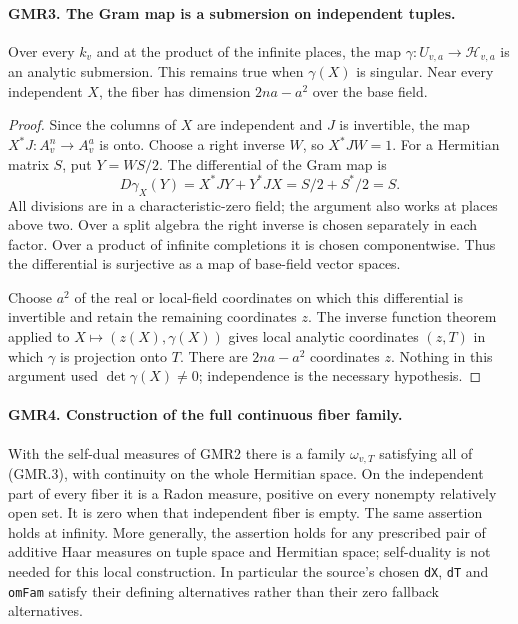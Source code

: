 
\paragraph{GMR3. The Gram map is a submersion on independent tuples.}
\label{claim:GMR3}
Over every $k_v$ and at the product of the infinite places, the map
$\gamma:U_{v,a}\to\mathcal H_{v,a}$ is an analytic submersion.
This remains true when $\gamma(X)$ is singular.  Near every independent
$X$, the fiber has dimension $2na-a^2$ over the base field.

\begin{proof}
Since the columns of $X$ are independent and $J$ is invertible, the
map $X^*J:A_v^n\to A_v^a$ is onto.  Choose a right inverse $W$, so
$X^*JW=1$.  For a Hermitian matrix $S$, put $Y=WS/2$.
The differential of the Gram map is
\[
 D\gamma_X(Y)=X^*JY+Y^*JX=S/2+S^*/2=S.
 \tag{GMR.8}
\]
All divisions are in a characteristic-zero field; the argument also
works at places above two.  Over a split algebra the right inverse
is chosen separately in each factor.  Over a product of infinite
completions it is chosen componentwise.  Thus the differential is
surjective as a map of base-field vector spaces.

Choose $a^2$ of the real or local-field coordinates on which this
differential is invertible and retain the remaining coordinates $z$.
The inverse function theorem applied to $X\mapsto(z(X),\gamma(X))$
gives local analytic coordinates $(z,T)$ in which $\gamma$ is projection
onto $T$.  There are $2na-a^2$ coordinates $z$.
Nothing in this argument used $\det\gamma(X)\ne0$; independence is the
necessary hypothesis.
\end{proof}

\paragraph{GMR4. Construction of the full continuous fiber family.}
\label{claim:GMR4}
With the self-dual measures of GMR2 there is a family
$\omega_{v,T}$ satisfying all of (GMR.3), with continuity on the whole
Hermitian space.  On the independent part of every fiber it is a Radon
measure, positive on every nonempty relatively open set.  It is zero
when that independent fiber is empty.  The same assertion holds at
infinity.  More generally, the assertion holds for any prescribed
pair of additive Haar measures on tuple space and Hermitian space;
self-duality is not needed for this local construction.
In particular the source's chosen \texttt{dX}, \texttt{dT}
and \texttt{omFam} satisfy their defining alternatives rather than
their zero fallback alternatives.

